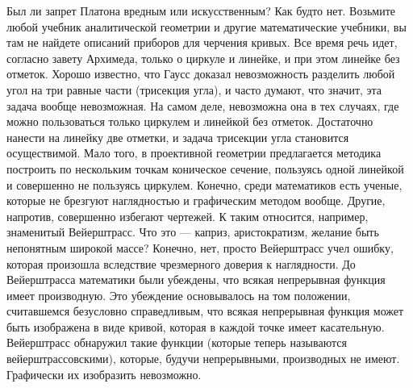 Был ли запрет Платона вредным или искусственным? Как будто нет.
Возьмите любой учебник аналитической геометрии и другие математические
учебники, вы там не найдете описаний приборов для черчения кривых. Все
время речь идет, согласно завету Архимеда, только о циркуле и линейке,
и при этом линейке без отметок. Хорошо известно, что Гаусс доказал
невозможность разделить любой угол на три равные части (трисекция
угла), и часто думают, что значит, эта задача вообще невозможная. На
самом деле, невозможна она в тех случаях, где можно пользоваться
только циркулем и линейкой без отметок. Достаточно нанести на линейку
две отметки, и задача трисекции угла становится осуществимой. Мало
того, в проективной геометрии предлагается методика построить по
нескольким точкам коническое сечение, пользуясь одной линейкой и
совершенно не пользуясь циркулем. Конечно, среди математиков есть
ученые, которые не брезгуют наглядностью и графическим методом вообще.
Другие, напротив, совершенно избегают чертежей. К таким относится,
например, знаменитый Вейерштрасс. Что это --- каприз, аристократизм,
желание быть непонятным широкой массе? Конечно, нет, просто
Вейерштрасс учел ошибку, которая произошла вследствие чрезмерного
доверия к наглядности. До Вейерштрасса математики были убеждены, что
всякая непрерывная функция имеет производную. Это убеждение
основывалось на том положении, считавшемся безусловно справедливым,
что всякая непрерывная функция может быть изображена в виде кривой,
которая в каждой точке имеет касательную. Вейерштрасс обнаружил такие
функции (которые теперь называются вейерштрассовскими), которые,
будучи непрерывными, производных не имеют. Графически их изобразить
невозможно.

